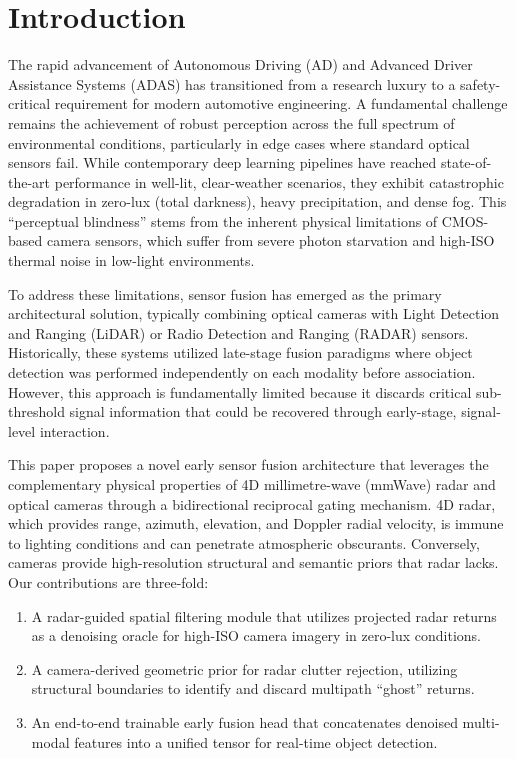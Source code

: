 \documentclass[conference]{IEEEtran}
\begin{document}
\section{Introduction}
The rapid advancement of Autonomous Driving (AD) and Advanced Driver Assistance Systems (ADAS) has transitioned from a research luxury to a safety-critical requirement for modern automotive engineering. A fundamental challenge remains the achievement of robust perception across the full spectrum of environmental conditions, particularly in edge cases where standard optical sensors fail. While contemporary deep learning pipelines have reached state-of-the-art performance in well-lit, clear-weather scenarios, they exhibit catastrophic degradation in zero-lux (total darkness), heavy precipitation, and dense fog. This ``perceptual blindness'' stems from the inherent physical limitations of CMOS-based camera sensors, which suffer from severe photon starvation and high-ISO thermal noise in low-light environments.

To address these limitations, sensor fusion has emerged as the primary architectural solution, typically combining optical cameras with Light Detection and Ranging (LiDAR) or Radio Detection and Ranging (RADAR) sensors. Historically, these systems utilized late-stage fusion paradigms where object detection was performed independently on each modality before association. However, this approach is fundamentally limited because it discards critical sub-threshold signal information that could be recovered through early-stage, signal-level interaction.

This paper proposes a novel early sensor fusion architecture that leverages the complementary physical properties of 4D millimetre-wave (mmWave) radar and optical cameras through a bidirectional reciprocal gating mechanism. 4D radar, which provides range, azimuth, elevation, and Doppler radial velocity, is immune to lighting conditions and can penetrate atmospheric obscurants. Conversely, cameras provide high-resolution structural and semantic priors that radar lacks. Our contributions are three-fold:
\begin{enumerate}
    \item A radar-guided spatial filtering module that utilizes projected radar returns as a denoising oracle for high-ISO camera imagery in zero-lux conditions.
    \item A camera-derived geometric prior for radar clutter rejection, utilizing structural boundaries to identify and discard multipath ``ghost'' returns.
    \item An end-to-end trainable early fusion head that concatenates denoised multi-modal features into a unified tensor for real-time object detection.
\end{enumerate}
\end{document}
